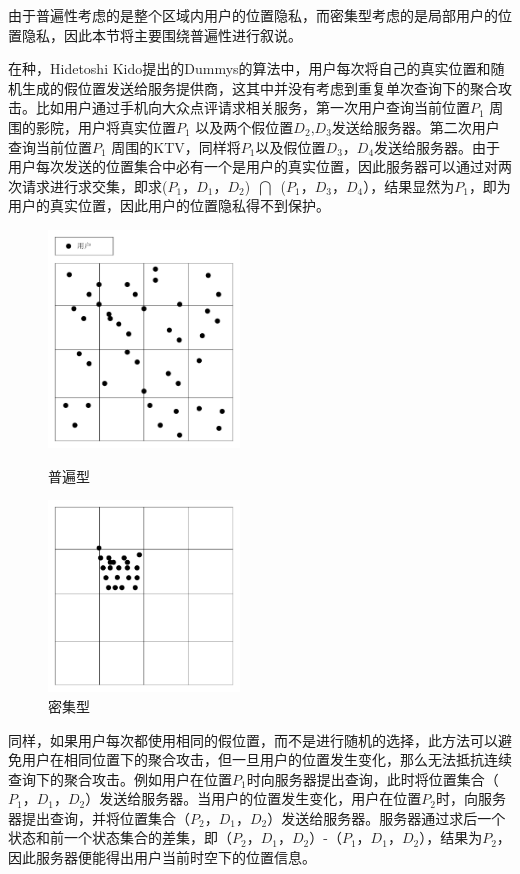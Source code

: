 由于普遍性考虑的是整个区域内用户的位置隐私，而密集型考虑的是局部用户的位置隐私，因此本节将主要围绕普遍性进行叙说。

在\cite{Dummies}种，Hidetoshi Kido提出的Dummys的算法中，用户每次将自己的真实位置和随机生成的假位置发送给服务提供商，这其中并没有考虑到重复单次查询下的聚合攻击。比如用户通过手机向大众点评请求相关服务，第一次用户查询当前位置$P_1$ 周围的影院，用户将真实位置$P_1$ 以及两个假位置$D_2$,$D_3$发送给服务器。第二次用户查询当前位置$P_1$ 周围的KTV，同样将$P_1$以及假位置$D_3$，$D_4$发送给服务器。由于用户每次发送的位置集合中必有一个是用户的真实位置，因此服务器可以通过对两次请求进行求交集，即求($P_1$，$D_1$，$D_2$)~$\bigcap$~($P_1$，$D_3$，$D_4$），结果显然为$P_1$，即为用户的真实位置，因此用户的位置隐私得不到保护。
\begin{figure}[H]
\begin{minipage}[t]{0.5\linewidth}
\centering
\includegraphics[width=2.0in]{fig/ubiquity.pdf}
\caption{普遍型}
\label{fig:side:a}
\end{minipage}%
\begin{minipage}[t]{0.5\linewidth}
\centering
\includegraphics[width=2.0in]{fig/congestion.pdf}
\caption{密集型}
\label{fig:side:b}
\end{minipage}
\end{figure}

同样，如果用户每次都使用相同的假位置，而不是进行随机的选择，此方法可以避免用户在相同位置下的聚合攻击，但一旦用户的位置发生变化，那么无法抵抗连续查询下的聚合攻击。例如用户在位置$P_1$时向服务器提出查询，此时将位置集合（$P_1$，$D_1$，$D_2$）发送给服务器。当用户的位置发生变化，用户在位置$P_2$时，向服务器提出查询，并将位置集合（$P_2$，$D_1$，$D_2$）发送给服务器。服务器通过求后一个状态和前一个状态集合的差集，即（$P_2$，$D_1$，$D_2$）-（$P_1$，$D_1$，$D_2$），结果为$P_2$，因此服务器便能得出用户当前时空下的位置信息。


